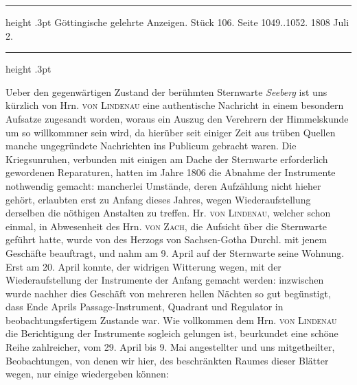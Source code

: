 \par\bigskip
{}
\hypertarget{native-503-lower}{}\label{native-503-lower}

\begin{center}
\parbox{.78\linewidth}{%
\centering\small
\hrule height .3pt\relax\vspace{2.5pt}
Göttingische gelehrte Anzeigen. Stück 106. Seite 1049..1052. 1808 Juli 2.\par
\vspace{2.5pt}\hrule height .3pt\relax
}
\end{center}

Ueber den gegenwärtigen Zustand der berühmten Sternwarte \emph{Seeberg} ist uns kürzlich von Hrn. \textsc{von Lindenau} eine authentische Nachricht in einem besondern Aufsatze zugesandt worden, woraus ein Auszug den Verehrern der Himmelskunde um so willkommner sein wird, da hierüber seit einiger Zeit aus trüben Quellen manche ungegründete Nachrichten ins Publicum gebracht waren. Die Kriegsunruhen, verbunden mit einigen am Dache der Sternwarte erforderlich gewordenen Reparaturen, hatten im Jahre 1806 die Abnahme der Instrumente nothwendig gemacht: mancherlei Umstände, deren Aufzählung nicht hieher gehört, erlaubten erst zu Anfang dieses Jahres, wegen Wiederaufstellung derselben die nöthigen Anstalten zu treffen. Hr. \textsc{von Lindenau}, welcher schon einmal, in Abwesenheit des Hrn. \textsc{von Zach}, die Aufsicht über die Sternwarte geführt hatte, wurde von des Herzogs von Sachsen-Gotha Durchl. mit jenem Geschäfte beauftragt, und nahm am 9. April auf der Sternwarte seine Wohnung. Erst am 20. April konnte, der widrigen Witterung wegen, mit der Wiederaufstellung der Instrumente der Anfang gemacht werden: inzwischen wurde nachher dies Geschäft von mehreren hellen Nächten so gut begünstigt, dass Ende Aprils Passage-Instrument, Quadrant und Regulator in beobachtungsfertigem Zustande war. Wie vollkommen dem Hrn. \textsc{von Lindenau} die Berichtigung der Instrumente sogleich gelungen ist, beurkundet eine schöne Reihe zahlreicher, vom 29. April bis 9. Mai angestellter und uns mitgetheilter, Beobachtungen, von denen wir hier, des beschränkten Raumes dieser Blätter wegen, nur einige wiedergeben können:

